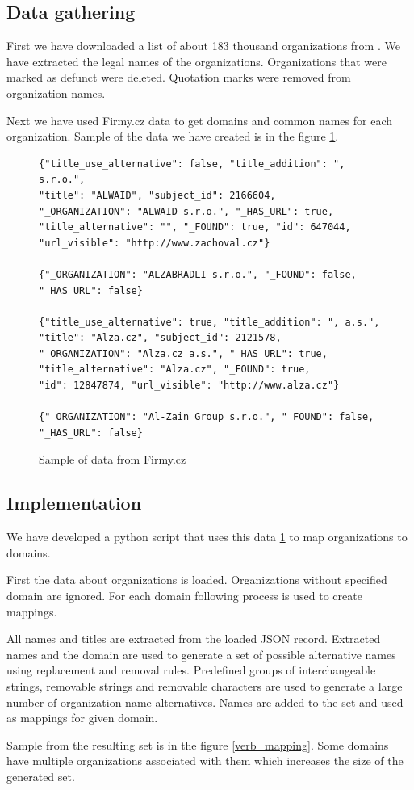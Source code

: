 \documentclass[thesis=B,english]{FITthesis}[2012/10/20]
\begin{document}
\subsection{Data gathering}
First we have downloaded a list of about 183 thousand organizations from \cite{opendata_orgs}. We have extracted the legal names of the organizations. Organizations that were marked as defunct were deleted. Quotation marks were removed from organization names. 
\par Next we have used Firmy.cz \cite{firmycz} data to get domains and common names for each organization.
Sample of the data we have created is in the figure \ref{verb_firmycz}. 

\begin{figure}[!ht]
    \centering
    \caption[Sample of data from Firmy.cz]{Sample of data from Firmy.cz\protect\footnotemark }
    \label{verb_firmycz}
    \begin{Verbatim}[fontsize=\small]
{"title_use_alternative": false, "title_addition": ", s.r.o.",
"title": "ALWAID", "subject_id": 2166604,
"_ORGANIZATION": "ALWAID s.r.o.", "_HAS_URL": true,
"title_alternative": "", "_FOUND": true, "id": 647044,
"url_visible": "http://www.zachoval.cz"}

{"_ORGANIZATION": "ALZABRADLI s.r.o.", "_FOUND": false,
"_HAS_URL": false}

{"title_use_alternative": true, "title_addition": ", a.s.",
"title": "Alza.cz", "subject_id": 2121578,
"_ORGANIZATION": "Alza.cz a.s.", "_HAS_URL": true,
"title_alternative": "Alza.cz", "_FOUND": true,
"id": 12847874, "url_visible": "http://www.alza.cz"}

{"_ORGANIZATION": "Al-Zain Group s.r.o.", "_FOUND": false,
"_HAS_URL": false}
    \end{Verbatim}
\end{figure}

\subsection{Implementation}
We have developed a python script that uses this data \ref{verb_firmycz} to map organizations to domains. 
\par First the data about organizations is loaded. Organizations without specified domain are ignored. 
For each domain following process is used to create mappings.
\par All names and titles are extracted from the loaded JSON record. Extracted names and the domain are used to generate a set of possible alternative names using replacement and removal rules. Predefined groups of interchangeable strings, removable strings and removable characters are used to generate a large number of organization name alternatives. Names are added to the set and used as mappings for given domain.
\par Sample from the resulting set is in the figure \ref{verb_mapping}. Some domains have multiple organizations associated with them which increases the size of the generated set.
\end{document}
